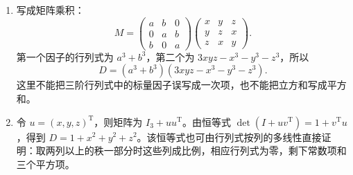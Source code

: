 \documentclass[12pt,fontset=fandol]{ctexart}
\begin{document}
\begin{solve}
\begin{enumerate}
\item 写成矩阵乘积：
\[M=\begin{pmatrix}a&b&0\\0&a&b\\b&0&a\end{pmatrix}\begin{pmatrix}x&y&z\\y&z&x\\z&x&y\end{pmatrix}.\]
第一个因子的行列式为 $a^3+b^3$，第二个为 $3xyz-x^3-y^3-z^3$，所以
\[D=(a^3+b^3)(3xyz-x^3-y^3-z^3).\]
这里不能把三阶行列式中的标量因子误写成一次项，也不能把立方和写成平方和。
\item 令 $u=(x,y,z)^{\mathrm T}$，则矩阵为 $I_3+uu^{\mathrm T}$。由恒等式 $\det(I+uv^{\mathrm T})=1+v^{\mathrm T}u$，得到 $D=1+x^2+y^2+z^2$。该恒等式也可由行列式按列的多线性直接证明：取两列以上的秩一部分时这些列成比例，相应行列式为零，剩下常数项和三个平方项。\end{enumerate}
\end{solve}
\end{document}
